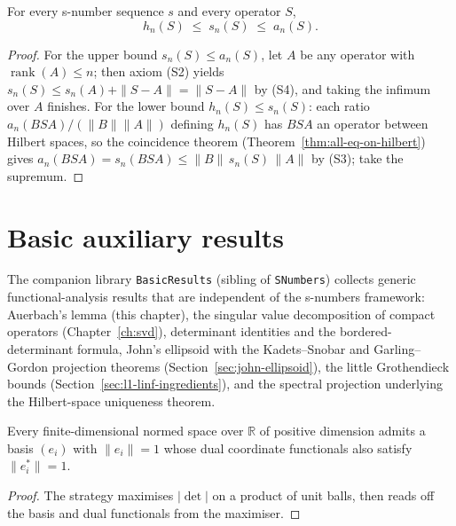 \begin{theorem}
\label{thm:sandwich}
\leanok
{}
For every s-number sequence $s$ and every operator $S$,
\[
h_n(S) \;\le\; s_n(S) \;\le\; a_n(S).
\]
\end{theorem}
\begin{proof}
\leanok
For the upper bound $s_n(S) \le a_n(S)$, let $A$ be any operator with
$\operatorname{rank}(A) \le n$; then axiom (S2) yields
$s_n(S) \le s_n(A) + \|S - A\| = \|S - A\|$ by (S4), and taking the
infimum over $A$ finishes. For the lower bound $h_n(S) \le s_n(S)$: each
ratio $a_n(B S A)/(\|B\|\|A\|)$ defining $h_n(S)$ has $B S A$ an operator
between Hilbert spaces, so the coincidence theorem
(Theorem~\ref{thm:all-eq-on-hilbert}) gives
$a_n(B S A) = s_n(B S A) \le \|B\| \, s_n(S) \, \|A\|$ by (S3); take the
supremum.
\end{proof}

\chapter{Basic auxiliary results}
\label{ch:basic-results}

The companion library \texttt{BasicResults} (sibling of \texttt{SNumbers})
collects generic functional-analysis results that are independent of the
s-numbers framework: Auerbach's lemma (this chapter), the singular value
decomposition of compact operators (Chapter~\ref{ch:svd}), determinant
identities and the bordered-determinant formula, John's ellipsoid with the
Kadets--Snobar and Garling--Gordon projection theorems
(Section~\ref{sec:john-ellipsoid}), the little Grothendieck bounds
(Section~\ref{sec:l1-linf-ingredients}), and the spectral projection
underlying the Hilbert-space uniqueness theorem.

\begin{theorem}
\label{thm:auerbach}
\leanok
Every finite-dimensional normed space over $\mathbb{R}$ of positive
dimension admits a basis $(e_i)$ with $\|e_i\| = 1$ whose dual coordinate
functionals also satisfy $\|e_i^*\| = 1$.
\end{theorem}
\begin{proof}
\leanok
The strategy maximises $|\det|$ on a product of unit balls, then reads off
the basis and dual functionals from the maximiser.
\end{proof}

